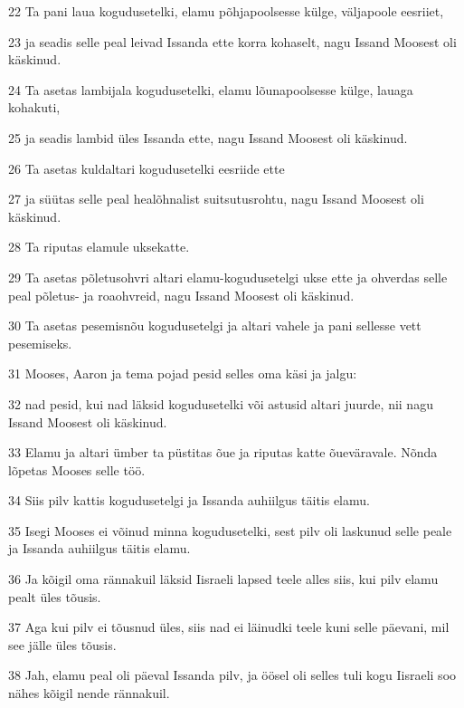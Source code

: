 \par 22 Ta pani laua kogudusetelki, elamu põhjapoolsesse külge, väljapoole eesriiet,
\par 23 ja seadis selle peal leivad Issanda ette korra kohaselt, nagu Issand Moosest oli käskinud.
\par 24 Ta asetas lambijala kogudusetelki, elamu lõunapoolsesse külge, lauaga kohakuti,
\par 25 ja seadis lambid üles Issanda ette, nagu Issand Moosest oli käskinud.
\par 26 Ta asetas kuldaltari kogudusetelki eesriide ette
\par 27 ja süütas selle peal healõhnalist suitsutusrohtu, nagu Issand Moosest oli käskinud.
\par 28 Ta riputas elamule uksekatte.
\par 29 Ta asetas põletusohvri altari elamu-kogudusetelgi ukse ette ja ohverdas selle peal põletus- ja roaohvreid, nagu Issand Moosest oli käskinud.
\par 30 Ta asetas pesemisnõu kogudusetelgi ja altari vahele ja pani sellesse vett pesemiseks.
\par 31 Mooses, Aaron ja tema pojad pesid selles oma käsi ja jalgu:
\par 32 nad pesid, kui nad läksid kogudusetelki või astusid altari juurde, nii nagu Issand Moosest oli käskinud.
\par 33 Elamu ja altari ümber ta püstitas õue ja riputas katte õueväravale. Nõnda lõpetas Mooses selle töö.
\par 34 Siis pilv kattis kogudusetelgi ja Issanda auhiilgus täitis elamu.
\par 35 Isegi Mooses ei võinud minna kogudusetelki, sest pilv oli laskunud selle peale ja Issanda auhiilgus täitis elamu.
\par 36 Ja kõigil oma rännakuil läksid Iisraeli lapsed teele alles siis, kui pilv elamu pealt üles tõusis.
\par 37 Aga kui pilv ei tõusnud üles, siis nad ei läinudki teele kuni selle päevani, mil see jälle üles tõusis.
\par 38 Jah, elamu peal oli päeval Issanda pilv, ja öösel oli selles tuli kogu Iisraeli soo nähes kõigil nende rännakuil.



